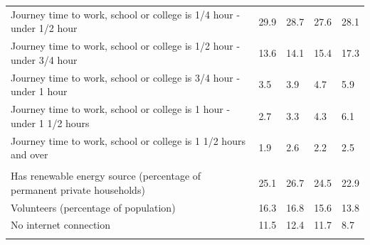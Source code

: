 \documentclass{article}
\begin{document}
\begin{table}[h]
\begin{tabular}{KTTTT}
Journey time to work, school or college is 1/4 hour - under 1/2 hour & 29.9& 28.7& 27.6& 28.1\\
Journey time to work, school or college is 1/2 hour - under 3/4 hour & 13.6& 14.1& 15.4& 17.3\\
Journey time to work, school or college is 3/4 hour - under 1 hour & 3.5& 3.9& 4.7& 5.9\\
Journey time to work, school or college is 1 hour - under 1 1/2 hours & 2.7& 3.3& 4.3& 6.1\\
Journey time to work, school or college is 1 1/2 hours and over & 1.9& 2.6& 2.2& 2.5\\
\hline
    \\ 
    \hline
Has renewable energy source (percentage of permanent private households) & 25.1& 26.7& 24.5& 22.9\\
    \hline
Volunteers (percentage of population) & 16.3& 16.8& 15.6& 13.8\\
    \hline
No internet connection& 11.5& 12.4& 11.7&  8.7\\
\hline
\end{tabular}
\end{table}
\end{document}
